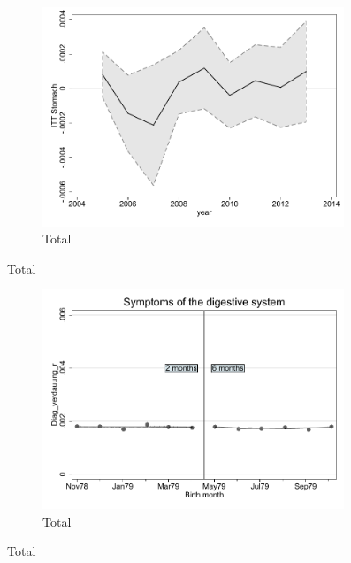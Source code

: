 \documentclass[a4paper ]{article}
\begin{document}
\begin{figure}[h!]
	\centering
	\begin{subfigure}[t]{0.5\textwidth}
		\centering
		\includegraphics[width=0.99\textwidth]{R1_LC_Stomach}
		\caption{Total}		
	\end{subfigure}
\end{figure}
\newpage
\begin{figure}[h]
	\centering
	\begin{subfigure}[t]{0.5\textwidth}
		\centering
		\includegraphics[width=0.99\textwidth]{R1_RD_Diag_verdauung_r_fits}
		\caption{Total}		
	\end{subfigure}
\end{figure}
\end{document}
